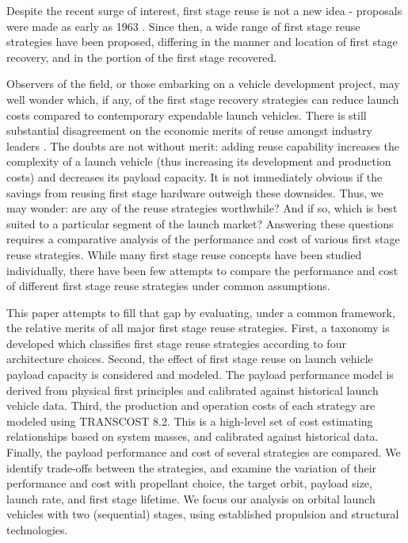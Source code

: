 \documentclass[conf]{new-aiaa}
\begin{document}
\begin{multicols}{2}
Despite the recent surge of interest, first stage reuse is not a new idea - proposals were made as early as 1963 \cite{Nexus, SeaDragon}. Since then, a wide range of first stage reuse strategies have been proposed, differing in the manner and location of first stage recovery, and in the portion of the first stage recovered.

Observers of the field, or those embarking on a vehicle development project, may well wonder which, if any, of the first stage recovery strategies can reduce launch costs compared to contemporary expendable launch vehicles. There is still substantial disagreement on the economic merits of reuse amongst industry leaders \cite{Cantrell17, Russell18, Selding16_orbital, Wall15, Selding16_spacex}. The doubts are not without merit: adding reuse capability increases the complexity of a launch vehicle (thus increasing its development and production costs) and decreases its payload capacity. It is not immediately obvious if the savings from reusing first stage hardware outweigh these downsides. Thus, we may wonder: are any of the reuse strategies worthwhile? And if so, which is best suited to a particular segment of the launch market? Answering these questions requires a comparative analysis of the performance and cost of various first stage reuse strategies. While many first stage reuse concepts have been studied individually, there have been few attempts to compare the performance and cost of different first stage reuse strategies under common assumptions.

This paper attempts to fill that gap by evaluating, under a common framework, the relative merits of all major first stage reuse strategies. First, a taxonomy is developed which classifies first stage reuse strategies according to four architecture choices. Second, the effect of first stage reuse on launch vehicle payload capacity is considered and modeled. The payload performance model is derived from physical first principles and calibrated against historical launch vehicle data. Third, the production and operation costs of each strategy are modeled using TRANSCOST 8.2. This is a high-level set of cost estimating relationships based on system masses, and calibrated against historical data. Finally, the payload performance and cost of several strategies are compared. We identify trade-offs between the strategies, and examine the variation of their performance and cost with propellant choice, the target orbit, payload size, launch rate, and first stage lifetime. We focus our analysis on orbital launch vehicles with two (sequential) stages, using established propulsion and structural technologies.


\end{multicols}
\end{document}
